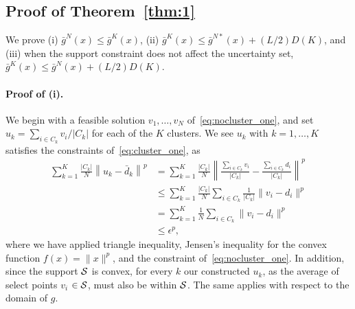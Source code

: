 \documentclass[12pt]{article}
\theoremstyle{thmstyleone}%
\theoremstyle{thmstyletwo}%
\theoremstyle{thmstylethree}%
\newcommand{\reviewChanges}{}
\begin{document}
\begin{appendices}
\section{Proof of Theorem~\ref{thm:1}}
\fi
\label{app:thm1}
We prove (i) $\bar{g}^N(x) \leq \bar{g}^K(x)$, (ii) $\bar{g}^K(x) \leq \bar{g}^{N*}(x) + (L/2) D(K)$, and (iii) when the support constraint does not affect the uncertainty set, ${\bar{g}^K(x) \leq \bar{g}^{N}(x) + (L/2) D(K)}$.

\paragraph{Proof of (i).} We begin with a feasible solution $v_1, \dots, v_{N}$ of~\eqref{eq:nocluster_one}, and set $u_k = \sum_{i \in C_k}{v_i}/|C_k|$ for each of the $K$ clusters. We see $u_k$ with $k = 1,\dots,K$ satisfies the constraints of~\eqref{eq:cluster_one}, as
\reviewChanges{
\begin{align*}
	\sum_{k = 1}^K \frac{|C_k|}{N}\left \| u_k - \bar{d}_k \right \|^p &= 	\sum_{k = 1}^K \frac{|C_k|}{N} \left \|  \frac{\sum_{i \in C_k}{v_i}}{|C_k|} -  \frac{\sum_{i \in C_k}{d_i}}{|C_k|} \right \|^p \\
	&\leq \sum_{k = 1}^K \frac{|C_k|}{N}   \sum_{i \in C_k} \frac{1}{|C_k|} \|v_i - d_i\|^p\\
	&= \sum_{k = 1}^K \frac{1}{N}  \sum_{i \in C_k} \|v_i - d_i\|^p\\
	&\leq \epsilon^p,
\end{align*}
where we have applied triangle inequality, Jensen's inequality for the convex function $f(x) = \|x\|^p$, and the constraint of~\eqref{eq:nocluster_one}. In addition, since the support $\mathcal{S}$ is convex, for every $k$ our constructed $u_k$, as the average of select points $v_i$ $\in \mathcal{S}$, must also be within $\mathcal{S}$. The same applies with respect to the domain of $g$.
}


\end{appendices}
\end{document}
